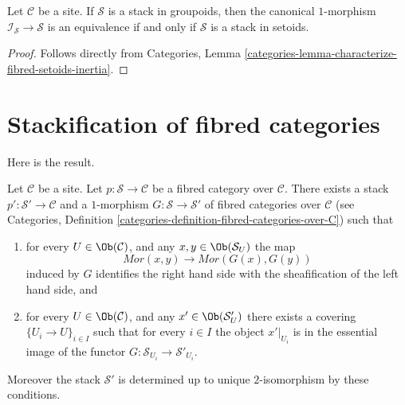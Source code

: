 \begin{lemma}
\label{lemma-characterize-stack-in-setoids}
Let $\mathcal{C}$ be a site.
If $\mathcal{S}$ is a stack in groupoids, then the
canonical $1$-morphism $\mathcal{I}_\mathcal{S} \to \mathcal{S}$
is an equivalence if and only if $\mathcal{S}$ is a stack in setoids.
\end{lemma}

\begin{proof}
Follows directly from
Categories, Lemma \ref{categories-lemma-characterize-fibred-setoids-inertia}.
\end{proof}




\section{Stackification of fibred categories}
\label{section-stackify}

\noindent
Here is the result.

\begin{lemma}
\label{lemma-stackify}
Let $\mathcal{C}$ be a site.
Let $p : \mathcal{S} \to \mathcal{C}$ be a fibred category over $\mathcal{C}$.
There exists a stack $p' : \mathcal{S}' \to \mathcal{C}$ and a
$1$-morphism $G : \mathcal{S} \to \mathcal{S}'$
of fibred categories over $\mathcal{C}$ (see
Categories, Definition \ref{categories-definition-fibred-categories-over-C})
such that
\begin{enumerate}
\item for every $U \in \Ob(\mathcal{C})$, and any
$x, y \in \Ob(\mathcal{S}_U)$ the map
$$
\mathit{Mor}(x, y) \longrightarrow \mathit{Mor}(G(x), G(y))
$$
induced by $G$ identifies the right hand side with the sheafification
of the left hand side, and
\item for every $U \in \Ob(\mathcal{C})$, and any
$x' \in \Ob(\mathcal{S}'_U)$ there exists a covering
$\{U_i \to U\}_{i \in I}$ such that for every $i \in I$ the
object $x'|_{U_i}$ is in the essential image of the
functor $G : \mathcal{S}_{U_i} \to \mathcal{S}'_{U_i}$.
\end{enumerate}
Moreover the stack $\mathcal{S}'$ is determined up to unique
$2$-isomorphism by these conditions.
\end{lemma}

